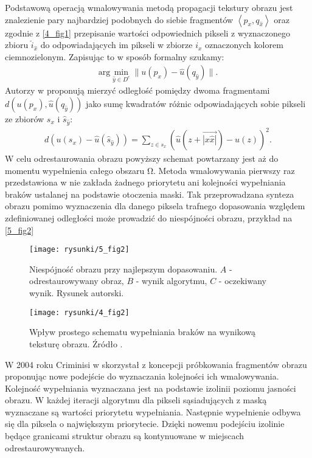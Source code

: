\documentclass[12pt, twoside, openany]{report}
\theoremstyle{definition}
\begin{document}
Podstawową operacją wmalowywania metodą propagacji tekstury obrazu jest znalezienie pary
 najbardziej podobnych do siebie fragmentów $\left\langle p_{x}, q_{\hat{x}} \right\rangle $ oraz zgodnie z \autoref{4_fig1} przepisanie wartości odpowiednich pikseli z wyznaczonego zbioru $\hat{i}_{\hat{x}}$ do odpowiadających im pikseli w zbiorze $i_x$ oznaczonych kolorem ciemnozielonym. Zapisując to w sposób formalny szukamy:
\begin{align}
\mathrm{arg} \mathop{\mathrm{min}}_{\hat{y} \in D^c} \big\| u(p_x) - \hat{u} (q_{\hat{y}} ) \big\| .
\label{FROBDIST}
\end{align}
Autorzy w \cite{criminisi2004region} proponują mierzyć odległość pomiędzy dwoma fragmentami $d\left( u(p_x), \hat{u} (q_{\hat{y}}) \right)$ jako sumę kwadratów różnic odpowiadających sobie pikseli ze zbiorów $s_x$ i ${\hat{s}}_{\hat{y}}$:
\begin{align}
d\left( u(s_x) - \hat{u}( \hat{s}_{\hat{y}} )\right)= \sum_{z \in s_x} \left( \hat{u}(z + \overrightarrow{|x \hat{x}|}) - u(z) \right)^2 .
\label{FROBENIUS2} 
\end{align}
W celu odrestaurowania obrazu powyższy schemat powtarzany jest aż do momentu wypełnienia całego obszaru $\mathrm{\Omega }$.
Metoda wmalowywania pierwszy raz przedstawiona w  \cite{efros1999texture} nie zakłada żadnego priorytetu ani kolejności wypełniania braków ustalanej na podstawie otoczenia maski. Tak przeprowadzana synteza obrazu pomimo wyznaczenia dla danego piksela trafnego dopasowania względem zdefiniowanej odległości może prowadzić do niespójności obrazu, przykład na \autoref{5_fig2}
\begin{figure}[!h]
	\centering
	\texttt{[image: rysunki/5\_fig2]}
	\caption{Niespójność obrazu przy najlepszym dopasowaniu. $A$ - odrestaurowywany obraz, $B$ - wynik algorytmu, $C$ - oczekiwany wynik. Rysunek autorski.}
	\label{5_fig2} 
\end{figure}
\begin{figure}[!h]
	\centering
	\texttt{[image: rysunki/4\_fig2]}
	\caption{Wpływ prostego schematu wypełniania braków na wynikową teksturę obrazu. Źródło \cite{criminisi2004region}.}
	\label{4_fig2} 
\end{figure}
W 2004 roku Criminisi w \cite{criminisi2004region} skorzystał z koncepcji próbkowania fragmentów obrazu proponując nowe podejście do wyznaczania kolejności ich wmalowywania.  Kolejność wypełniania wyznaczana jest na podstawie izolinii poziomu jasności obrazu. W każdej iteracji algorytmu dla pikseli sąsiadujących z maską wyznaczane są wartości priorytetu wypełniania. Następnie wypełnienie odbywa się dla piksela o największym priorytecie. Dzięki nowemu podejściu izolinie będące granicami struktur obrazu są kontynuowane w miejscach odrestaurowywanych.
\end{document}
